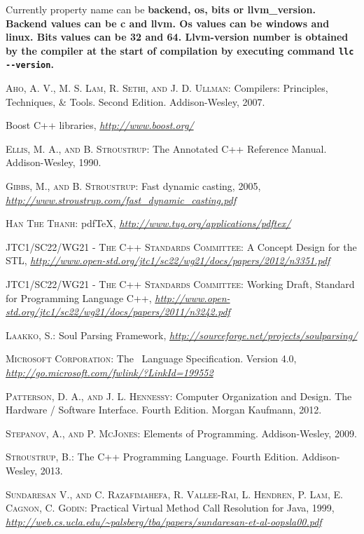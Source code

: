 \documentclass[a4paper,oneside,11pt]{article}
\begin{document}
Currently property name can be \bf{backend}, \bf{os}, \bf{bits} or \bf{llvm\_version}.
Backend values can be \bf{c} and \bf{llvm}.
Os values can be \bf{windows} and \bf{linux}.
Bits values can be \bf{32} and \bf{64}.
Llvm-version number is obtained by the compiler at the start of compilation by executing command \verb|llc --version|.

\clearpage

\begin{thebibliography}{13}

 \textsc{Aho, A. V., M. S. Lam, R. Sethi, and J. D. Ullman}:
Compilers: Principles, Techniques, \& Tools. Second Edition. Addison-Wesley, 2007.

 Boost C++ libraries,
\textit{\url{http://www.boost.org/}}

 \textsc{Ellis, M. A., and B. Stroustrup}:
The Annotated C++ Reference Manual. Addison-Wesley, 1990.

 \textsc{Gibbs, M., and B. Stroustrup}:
Fast dynamic casting, 2005,
\textit{\url{http://www.stroustrup.com/fast_dynamic_casting.pdf}}

 \textsc{Han The Thanh}:
pdf\TeX, \textit{\url{http://www.tug.org/applications/pdftex/}}

 \textsc{JTC1/SC22/WG21 - The C++ Standards Committee}:
A Concept Design for the STL,
\textit{\url{http://www.open-std.org/jtc1/sc22/wg21/docs/papers/2012/n3351.pdf}}

 \textsc{JTC1/SC22/WG21 - The C++ Standards Committee}:
Working Draft, Standard for Programming Language C++,
\textit{\url{http://www.open-std.org/jtc1/sc22/wg21/docs/papers/2011/n3242.pdf}}

 \textsc{Laakko, S.}:
Soul Parsing Framework,
\textit{\url{http://sourceforge.net/projects/soulparsing/}}

 \textsc{Microsoft Corporation}:
The \csharp\ Language Specification. Version 4.0,
\textit{\url{http://go.microsoft.com/fwlink/?LinkId=199552}}

 \textsc{Patterson, D. A., and J. L. Hennessy}:
Computer Organization and Design. The Hardware / Software Interface. Fourth Edition.
Morgan Kaufmann, 2012.

 \textsc{Stepanov, A., and P. McJones}:
Elements of Programming. Addison-Wesley, 2009.

 \textsc{Stroustrup, B.}:
The C++ Programming Language. Fourth Edition. Addison-Wesley, 2013.

 \textsc{Sundaresan V., and C. Razafimahefa, R. Vallee-Rai, L. Hendren, P. Lam, E. Cagnon, C. Godin}:
Practical Virtual Method Call Resolution for Java, 1999,
\textit{\url{http://web.cs.ucla.edu/~palsberg/tba/papers/sundaresan-et-al-oopsla00.pdf}}

\end{thebibliography}
\end{document}
